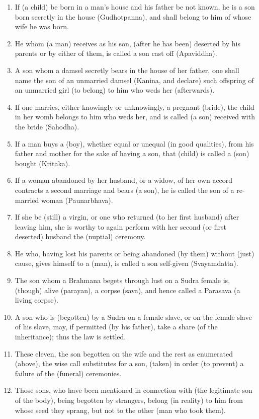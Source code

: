 \begin{enumerate}
\item If (a child) be born in a man's house and his father be not known, he is a son born secretly in the house (Gudhotpanna), and shall belong to him of whose wife he was born.
\item He whom (a man) receives as his son, (after he has been) deserted by his parents or by either of them, is called a son cast off (Apaviddha).
\item A son whom a damsel secretly bears in the house of her father, one shall name the son of an unmarried damsel (Kanina, and declare) such offspring of an unmarried girl (to belong) to him who weds her (afterwards).
\item If one marries, either knowingly or unknowingly, a pregnant (bride), the child in her womb belongs to him who weds her, and is called (a son) received with the bride (Sahodha).
\item If a man buys a (boy), whether equal or unequal (in good qualities), from his father and mother for the sake of having a son, that (child) is called a (son) bought (Kritaka).
\item If a woman abandoned by her husband, or a widow, of her own accord contracts a second marriage and bears (a son), he is called the son of a re-married woman (Paunarbhava).
\item If she be (still) a virgin, or one who returned (to her first husband) after leaving him, she is worthy to again perform with her second (or first deserted) husband the (nuptial) ceremony.
\item He who, having lost his parents or being abandoned (by them) without (just) cause, gives himself to a (man), is called a son self-given (Svayamdatta).
\item The son whom a Brahmana begets through lust on a Sudra female is, (though) alive (parayan), a corpse (sava), and hence called a Parasava (a living corpse).
\item A son who is (begotten) by a Sudra on a female slave, or on the female slave of his slave, may, if permitted (by his father), take a share (of the inheritance); thus the law is settled.
\item These eleven, the son begotten on the wife and the rest as enumerated (above), the wise call substitutes for a son, (taken) in order (to prevent) a failure of the (funeral) ceremonies.
\item Those sons, who have been mentioned in connection with (the legitimate son of the body), being begotten by strangers, belong (in reality) to him from whose seed they sprang, but not to the other (man who took them).

\end{enumerate}
